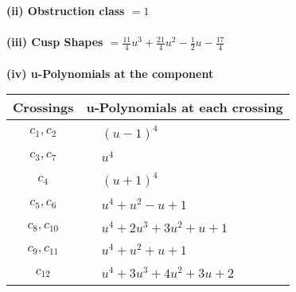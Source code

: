 \documentclass[1p]{elsarticle_modified}
\theoremstyle{definition}
\begin{document}
\flushleft \textbf{(ii) Obstruction class $= 1$}\\~\\
\flushleft \textbf{(iii) Cusp Shapes $= \frac{11}{4} u^3+\frac{21}{4} u^2-\frac{1}{2} u-\frac{17}{4}$}\\~\\
\newpage\renewcommand{\arraystretch}{1}
\flushleft \textbf{(iv) u-Polynomials at the component}\newline \\
\begin{tabular}{m{50pt}|m{274pt}}
Crossings & \hspace{64pt}u-Polynomials at each crossing \\
\hline $$\begin{aligned}c_{1},c_{2}\end{aligned}$$&$\begin{aligned}
&(u-1)^4
\end{aligned}$\\
\hline $$\begin{aligned}c_{3},c_{7}\end{aligned}$$&$\begin{aligned}
&u^4
\end{aligned}$\\
\hline $$\begin{aligned}c_{4}\end{aligned}$$&$\begin{aligned}
&(u+1)^4
\end{aligned}$\\
\hline $$\begin{aligned}c_{5},c_{6}\end{aligned}$$&$\begin{aligned}
&u^4+u^2- u+1
\end{aligned}$\\
\hline $$\begin{aligned}c_{8},c_{10}\end{aligned}$$&$\begin{aligned}
&u^4+2 u^3+3 u^2+u+1
\end{aligned}$\\
\hline $$\begin{aligned}c_{9},c_{11}\end{aligned}$$&$\begin{aligned}
&u^4+u^2+u+1
\end{aligned}$\\
\hline $$\begin{aligned}c_{12}\end{aligned}$$&$\begin{aligned}
&u^4+3 u^3+4 u^2+3 u+2
\end{aligned}$\\
\hline
\end{tabular}\\~\\
\end{document}
